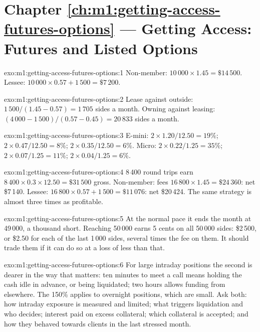 \section*{Chapter \ref{ch:m1:getting-access-futures-options} --- Getting Access: Futures and Listed Options}

\begin{solution}{exo:m1:getting-access-futures-options:1}
Non-member: $10\,000 \times 1.45 = \$14\,500$. Lessee: $10\,000 \times 0.57 + 1\,500
= \$7\,200$.
\end{solution}

\begin{solution}{exo:m1:getting-access-futures-options:2}
Lease against outside: $1\,500/(1.45 - 0.57) = 1\,705$ sides a month. Owning
against leasing: $(4\,000 - 1\,500)/(0.57 - 0.45) = 20\,833$ sides a month.
\end{solution}

\begin{solution}{exo:m1:getting-access-futures-options:3}
E-mini: $2 \times 1.20/12.50 = 19\%$; $2 \times 0.47/12.50 = 8\%$; $2 \times
0.35/12.50 = 6\%$. Micro: $2 \times 0.22/1.25 = 35\%$; $2 \times 0.07/1.25 = 11\%$;
$2 \times 0.04/1.25 = 6\%$.
\end{solution}

\begin{solution}{exo:m1:getting-access-futures-options:4}
8\,400 round trips earn $8\,400 \times 0.3 \times 12.50 = \$31\,500$ gross.
Non-member: fees $16\,800 \times 1.45 = \$24\,360$: net \$7\,140. Lessee: $16\,800
\times 0.57 + 1\,500 = \$11\,076$: net \$20\,424. The same strategy is almost
three times as profitable.
\end{solution}

\begin{solution}{exo:m1:getting-access-futures-options:5}
At the normal pace it ends the month at 49\,000, a thousand short. Reaching
50\,000 earns 5 cents on all 50\,000 sides: \$2\,500, or \$2.50 for each of the
last 1\,000 sides, several times the fee on them. It should trade them if it
can do so at a loss of less than that.
\end{solution}

\begin{solution}{exo:m1:getting-access-futures-options:6}
For large intraday positions the second is dearer in the way that matters:
ten minutes to meet a call means holding the cash idle in advance, or being
liquidated; two hours allows funding from elsewhere. The 150\% applies to
overnight positions, which are small. Ask both: how intraday exposure is
measured and limited; what triggers liquidation and who decides; interest
paid on excess collateral; which collateral is accepted; and how they
behaved towards clients in the last stressed month.
\end{solution}

